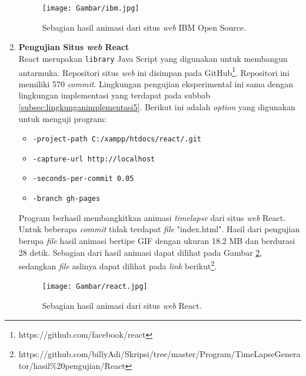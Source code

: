 \begin{enumerate}

\begin{figure}[H]	
		\texttt{[image: Gambar/ibm.jpg]}
	\caption{Sebagian hasil animasi dari situs \textit{web} IBM Open Source.}
	\label{fig:hasil_ibm}
\end{figure}


\item \textbf{Pengujian Situs \textit{web} React}\\
React merupakan \texttt{library} Java Script yang digunakan untuk membangun antarmuka. Repositori situs \textit{web} ini disimpan pada GitHub\footnote{https://github.com/facebook/react}. Repositori ini memiliki 570 \textit{commit}. Lingkungan pengujian eksperimental ini sama dengan lingkungan implementasi yang terdapat pada subbab \ref{subsec:lingkunganimplementasi5}. Berikut ini adalah \textit{option} yang digunakan untuk menguji program:
\begin{itemize}
\item \texttt{-project-path C:/xampp/htdocs/react/.git}
\item \texttt{-capture-url http://localhost}
\item \texttt{-seconds-per-commit 0.05}
\item \texttt{-branch gh-pages} 
\end{itemize}
Program berhasil membangkitkan animasi \textit{timelapse} dari situs \textit{web} React. Untuk beberapa \textit{commit} tidak terdapat \textit{file} "index.html". Hasil dari pengujian berupa \textit{file} hasil animasi bertipe GIF dengan ukuran 18.2 MB dan berdurasi 28 detik. Sebagian dari hasil animasi dapat dilihat pada Gambar \ref{fig:hasil_react}, sedangkan \textit{file} aslinya dapat dilihat pada \textit{link} berikut\footnote{https://github.com/billyAdi/Skripsi/tree/master/Program/TimeLapseGenerator/hasil\%20pengujian/React}.


\begin{figure}[H]	
		\texttt{[image: Gambar/react.jpg]}
	\caption{Sebagian hasil animasi dari situs \textit{web} React.}
	\label{fig:hasil_react}
\end{figure}





\end{enumerate}

